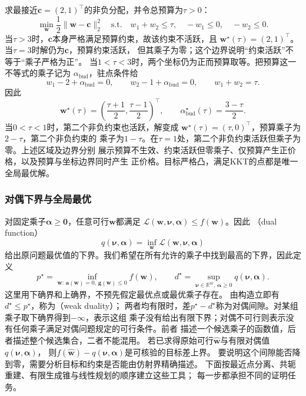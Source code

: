 \begin{example}
\label{ex:opt-kkt-budget}
求最接近$\bm{c}=(2,1)^{\top}$的非负分配，并令总预算为$\tau>0$：
\[
  \min_{\bm{w}}\frac12\lVert\bm{w}-\bm{c}\rVert_2^2
  \quad\text{s.t.}\quad
  w_1+w_2\leq\tau,\quad -w_1\leq0,\quad -w_2\leq0.
\]
当$\tau>3$时，$\bm{c}$本身严格满足预算约束，故该约束不活跃，且
$\bm{w}^{\star}(\tau)=(2,1)^{\top}$。当$\tau=3$时解仍为$\bm{c}$，预算约束活跃，
但其乘子为零；这个边界说明“约束活跃”不等于“乘子严格为正”。
当$1<\tau<3$时，两个坐标仍为正而预算取等。把预算这一不等式的乘子记为
$\alpha_{\mathrm{bud}}$，驻点条件给
\[
  w_1-2+\alpha_{\mathrm{bud}}=0,\qquad
  w_2-1+\alpha_{\mathrm{bud}}=0,\qquad
  w_1+w_2=\tau.
\]
因此
\[
  \bm{w}^{\star}(\tau)
  =\left(\frac{\tau+1}{2},\frac{\tau-1}{2}\right)^{\top},
  \qquad
  \alpha_{\mathrm{bud}}^{\star}(\tau)=\frac{3-\tau}{2}.
\]
当$0<\tau<1$时，第二个非负约束也活跃，解变成
$\bm{w}^{\star}(\tau)=(\tau,0)^{\top}$，预算乘子为$2-\tau$，第二个非负约束的
乘子为$1-\tau$。在$\tau=1$处，第二个非负约束活跃但乘子为零。上述区域及边界分别
展示预算不生效、约束活跃但零乘子、仅预算产生正价格，以及预算与坐标边界同时产生
正价格。目标严格凸，满足KKT的点都是唯一全局最优解。
\end{example}

\subsubsection{对偶下界与全局最优}
\label{sec:opt-duality}
\label{sec:opt-affine-certificates}

对固定乘子$\bm{\alpha}\geq\bm{0}$，任意可行$\bm{w}$都满足
$\mathcal{L}(\bm{w},\bm{\nu},\bm{\alpha})\leq f(\bm{w})$。因此
（dual function）
\[
  q(\bm{\nu},\bm{\alpha})
  =\inf_{\bm{w}}\mathcal{L}(\bm{w},\bm{\nu},\bm{\alpha})
\]
给出原问题最优值的下界。我们希望在所有允许的乘子中找到最高的下界，因此定义
\[
 p^\star=\inf_{\bm w:\,\bm a(\bm w)=0,\,\bm g(\bm w)\leq0}f(\bm w),\qquad
 d^\star=\sup_{\bm\nu\in\mathbb R^m,\,\bm\alpha\geq0}q(\bm\nu,\bm\alpha).
\]
这里用下确界和上确界，不预先假定最优点或最优乘子存在。
由构造立即有$d^{\star}\leq p^{\star}$，称为（weak duality）；
两者均有限时，差$p^{\star}-d^{\star}$称为对偶间隙。对某组乘子取下确界得到$-\infty$，表示这组
乘子没有给出有限下界；对偶不可行则表示没有任何乘子满足对偶问题规定的可行条件。前者
描述一个候选乘子的函数值，后者描述整个候选集合，二者不能混用。
若已求得原始可行$\widehat{\bm w}$与有限对偶值$q(\bm\nu,\bm\alpha)$，
则$f(\widehat{\bm w})-q(\bm\nu,\bm\alpha)$是可核验的目标差上界。
要说明这个间隙能否降到零，需要分析目标和约束是否能由仿射界精确描述。
下面按最近点分离、共轭重建、有限生成锥与线性规划的顺序建立这些工具；
每一步都承担不同的证明任务。


